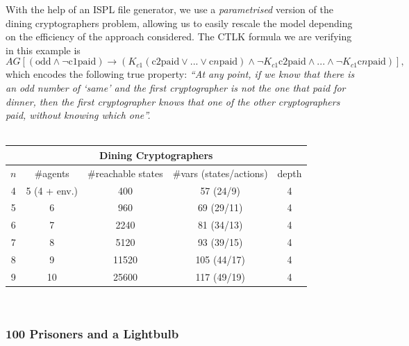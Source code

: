 \documentclass[11pt]{report}
\begin{document}
With the help of an ISPL file generator, we use a \textit{parametrised} version of the dining cryptographers problem, allowing us to easily rescale the model depending on the efficiency of the approach considered. The CTLK formula we are verifying in this example is 
$$AG\left[(\mbox{odd} \land \lnot \mbox{c1paid}) \rightarrow (K_{c1} (\mbox{c2paid} \lor ... \lor \mbox{c$n$paid}) \land \lnot K_{c1} \mbox{c2paid} \land ...  \land \lnot K_{c1} \mbox{c$n$paid})\right],$$
which encodes the following true property:
\textit{ ``At any point, if we know that there is an odd number of `same' and the first cryptographer is not the one that paid for dinner, then the first cryptographer knows that one of the other cryptographers paid, without knowing which one''.}
\\\\

{\centering
\begin{tabular}{*{5}{c}}
\hline
\hline
\multicolumn{5}{c}{\textbf{Dining Cryptographers}}\\ \hline
$n$ & \#agents & \#reachable states & \#vars (states/actions) & depth \\\hline
4 & 5 (4 + env.) & 400  & 57 (24/9) & 4 \\ \hline
5 & 6 & 960  & 69 (29/11) & 4 \\ \hline
6 & 7 & 2240  & 81 (34/13) & 4 \\ \hline
7 & 8 & 5120  & 93 (39/15) & 4 \\ \hline
8 & 9 & 11520  & 105 (44/17) & 4 \\ \hline
9 & 10 & 25600  & 117 (49/19) & 4 \\\hline

\end{tabular}
\\}

\subsubsection{100 Prisoners and a Lightbulb}
\end{document}
